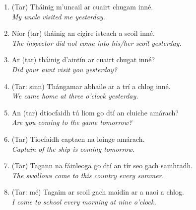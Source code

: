 \documentclass[article,a4paper,oneside,12pt]{memoir}
\begin{document}
\begin{enumerate}
  \item (Tar) Tháinig m'uncail ar cuairt chugam inn\'{e}.\\
    	\emph{My uncle visited me yesterday.}
  \item Níor (tar) tháinig an cigire isteach a scoil inn\'{e}.\\
    	\emph{The inspector did not come into his/her scoil yesterday.}
  \item Ar (tar) tháinig d'aintín ar cuairt chugat inn\'{e}?\\
    	\emph{Did your aunt visit you yesterday?}
  \item (Tar: sinn) Thángamar abhaile ar a trí a chlog inn\'{e}.\\
    	\emph{We came home at three o'clock yesterday.}
  \item An (tar) dtiocfaidh tú liom go dtí an cluiche amárach?\\
    	\emph{Are you coming to the game tomorrow?}
  \item (Tar) Tiocfaidh captaen na loinge amárach.\\
	\emph{Captain of the ship is coming tomorrow.}
  \item (Tar) Tagann na fáinleoga go dtí an tír seo gach samhradh.\\
	\emph{The swallows come to this country every summer.}
  \item (Tar: m\'{e}) Tagaim ar scoil gach maidin ar a naoi a chlog.\\
	\emph{I come to school every morning at nine o'clock.}
\end{enumerate}
\end{document}
